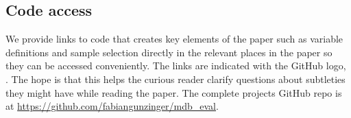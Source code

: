 \subsection{Code access}%
\label{sub:code_access}

We provide links to code that creates key elements of the paper such as
variable definitions and sample selection directly in the relevant places in
the paper so they can be accessed conveniently. The links are indicated with
the GitHub logo, \faGithub. The hope is that this helps the
curious reader clarify questions about subtleties they might have while reading
the paper. The complete projects GitHub repo is at
\href{https://github.com/fabiangunzinger/mdb\_eval}{https://github.com/fabiangunzinger/mdb\_eval}.


